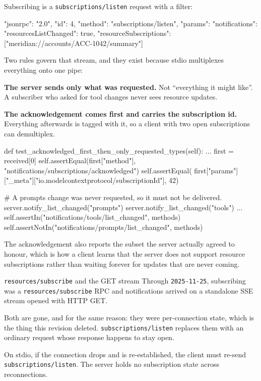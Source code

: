 Subscribing is a \texttt{subscriptions/listen} request with a filter:

\begin{wire}
{
  "jsonrpc": "2.0",
  "id": 4,
  "method": "subscriptions/listen",
  "params": {
    "notifications": {
      "resourcesListChanged": true,
      "resourceSubscriptions": ["meridian://accounts/ACC-1042/summary"]
    }
  }
}
\end{wire}

Two rules govern that stream, and they exist because stdio multiplexes
everything onto one pipe:

\textbf{The server sends only what was requested.} Not ``everything it might
like''. A subscriber who asked for tool changes never sees resource updates.

\textbf{The acknowledgement comes first and carries the subscription id.}
Everything afterwards is tagged with it, so a client with two open subscriptions
can demultiplex.

\begin{py}
def test_acknowledged_first_then_only_requested_types(self):
    ...
    first = received[0]
    self.assertEqual(first["method"],
                     "notifications/subscriptions/acknowledged")
    self.assertEqual(
        first["params"]["_meta"]["io.modelcontextprotocol/subscriptionId"], 42)

    # A prompts change was never requested, so it must not be delivered.
    server.notify_list_changed("prompts")
    server.notify_list_changed("tools")
    ...
    self.assertIn("notifications/tools/list_changed", methods)
    self.assertNotIn("notifications/prompts/list_changed", methods)
\end{py}

The acknowledgement also reports the subset the server actually agreed to
honour, which is how a client learns that the server does not support resource
subscriptions rather than waiting forever for updates that are never coming.

\begin{legacybox}{\texttt{resources/subscribe} and the GET stream}
Through \texttt{2025-11-25}, subscribing was a \texttt{resources/subscribe} RPC
and notifications arrived on a standalone SSE stream opened with HTTP GET.

Both are gone, and for the same reason: they were per-connection state, which is
the thing this revision deleted. \texttt{subscriptions/listen} replaces them with
an ordinary request whose response happens to stay open.

On stdio, if the connection drops and is re-established, the client must re-send
\texttt{subscriptions/listen}. The server holds no subscription state across
reconnections.
\end{legacybox}

